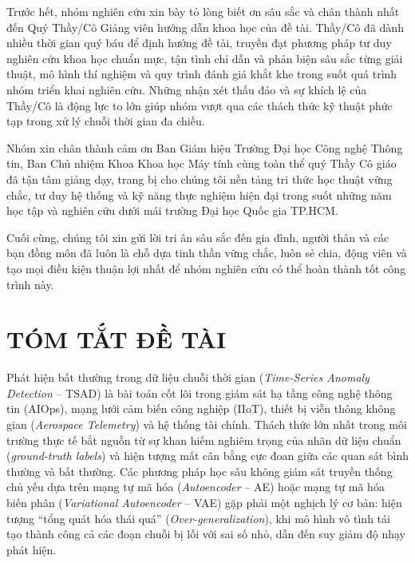 \documentclass[11pt,journal,onecolumn]{IEEEtran}
\begin{document}
Trước hết, nhóm nghiên cứu xin bày tỏ lòng biết ơn sâu sắc và chân thành nhất đến Quý Thầy/Cô Giảng viên hướng dẫn khoa học của đề tài. Thầy/Cô đã dành nhiều thời gian quý báu để định hướng đề tài, truyền đạt phương pháp tư duy nghiên cứu khoa học chuẩn mực, tận tình chỉ dẫn và phản biện sâu sắc từng giải thuật, mô hình thí nghiệm và quy trình đánh giá khắt khe trong suốt quá trình nhóm triển khai nghiên cứu. Những nhận xét thấu đáo và sự khích lệ của Thầy/Cô là động lực to lớn giúp nhóm vượt qua các thách thức kỹ thuật phức tạp trong xử lý chuỗi thời gian đa chiều.

Nhóm xin chân thành cảm ơn Ban Giám hiệu Trường Đại học Công nghệ Thông tin, Ban Chủ nhiệm Khoa Khoa học Máy tính cùng toàn thể quý Thầy Cô giáo đã tận tâm giảng dạy, trang bị cho chúng tôi nền tảng tri thức học thuật vững chắc, tư duy hệ thống và kỹ năng thực nghiệm hiện đại trong suốt những năm học tập và nghiên cứu dưới mái trường Đại học Quốc gia TP.HCM.

Cuối cùng, chúng tôi xin gửi lời tri ân sâu sắc đến gia đình, người thân và các bạn đồng môn đã luôn là chỗ dựa tinh thần vững chắc, luôn sẻ chia, động viên và tạo mọi điều kiện thuận lợi nhất để nhóm nghiên cứu có thể hoàn thành tốt công trình này.

\newpage

\section*{TÓM TẮT ĐỀ TÀI}

Phát hiện bất thường trong dữ liệu chuỗi thời gian (\textit{Time-Series Anomaly Detection} -- TSAD) là bài toán cốt lõi trong giám sát hạ tầng công nghệ thông tin (AIOps), mạng lưới cảm biến công nghiệp (IIoT), thiết bị viễn thông không gian (\textit{Aerospace Telemetry}) và hệ thống tài chính. Thách thức lớn nhất trong môi trường thực tế bắt nguồn từ sự khan hiếm nghiêm trọng của nhãn dữ liệu chuẩn (\textit{ground-truth labels}) và hiện tượng mất cân bằng cực đoan giữa các quan sát bình thường và bất thường. Các phương pháp học sâu không giám sát truyền thống chủ yếu dựa trên mạng tự mã hóa (\textit{Autoencoder} -- AE) hoặc mạng tự mã hóa biến phân (\textit{Variational Autoencoder} -- VAE) gặp phải một nghịch lý cơ bản: hiện tượng ``tổng quát hóa thái quá'' (\textit{Over-generalization}), khi mô hình vô tình tái tạo thành công cả các đoạn chuỗi bị lỗi với sai số nhỏ, dẫn đến suy giảm độ nhạy phát hiện.
\end{document}
